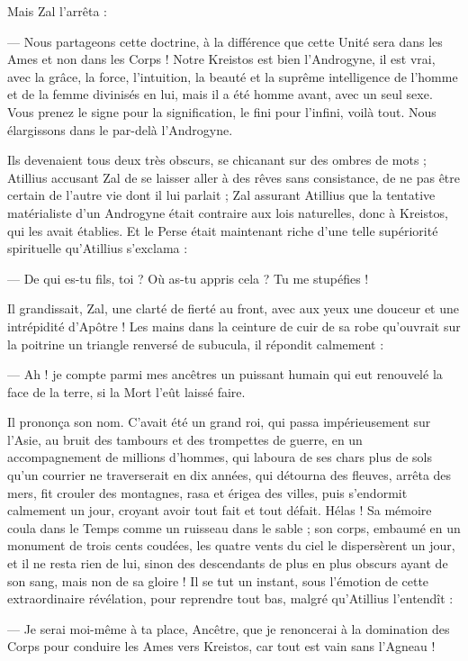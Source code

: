 \documentclass[a4paper, 11pt, oneside, polutonikogreek, french]{article}
\begin{document}
Mais Zal l'arrêta :

--- Nous partageons cette doctrine, à la différence que cette Unité sera dans les Ames et non dans les Corps ! Notre Kreistos est bien l'Androgyne, il est vrai, avec la grâce, la force, l'intuition, la beauté et la suprême intelligence de l'homme et de la femme divinisés en lui, mais il a été homme avant, avec un seul sexe. Vous prenez le signe pour la signification, le fini pour l'infini, voilà tout. Nous élargissons dans le par-delà l'Androgyne.

Ils devenaient tous deux très obscurs, se chicanant sur des ombres de mots ; Atillius accusant Zal de se laisser aller à des rêves sans consistance, de ne pas être certain de l'autre vie dont il lui parlait ; Zal assurant Atillius que la tentative matérialiste d'un Androgyne était contraire aux lois naturelles, donc à Kreistos, qui les avait établies. Et le Perse était maintenant riche d'une telle supériorité spirituelle qu'Atillius s'exclama :

--- De qui es-tu fils, toi ? Où as-tu appris cela ? Tu me stupéfies !

Il grandissait, Zal, une clarté de fierté au front, avec aux yeux une douceur et une intrépidité d'Apôtre ! Les mains dans la ceinture de cuir de sa robe qu'ouvrait sur la poitrine un triangle renversé de subucula, il répondit calmement :

--- Ah ! je compte parmi mes ancêtres un puissant humain qui eut renouvelé la face de la terre, si la Mort l'eût laissé faire.

Il prononça son nom. C'avait été un grand roi, qui passa impérieusement sur l'Asie, au bruit des tambours et des trompettes de guerre, en un accompagnement de millions d’hommes, qui laboura de ses chars plus de sols qu'un courrier ne traverserait en dix années, qui détourna des fleuves, arrêta des mers, fit crouler des montagnes, rasa et érigea des villes, puis s'endormit calmement un jour, croyant avoir tout fait et tout défait. Hélas ! Sa mémoire coula dans le Temps comme un ruisseau dans le sable ; son corps, embaumé en un monument de trois cents coudées, les quatre vents du ciel le dispersèrent un jour, et il ne resta rien de lui, sinon des descendants de plus en plus obscurs ayant de son sang, mais non de sa gloire ! Il se tut un instant, sous l'émotion de cette extraordinaire révélation, pour reprendre tout bas, malgré qu'Atillius l'entendît :

--- Je serai moi-même à ta place, Ancêtre, que je renoncerai à la domination des Corps pour conduire les Ames vers Kreistos, car tout est vain sans l'Agneau !
\end{document}
